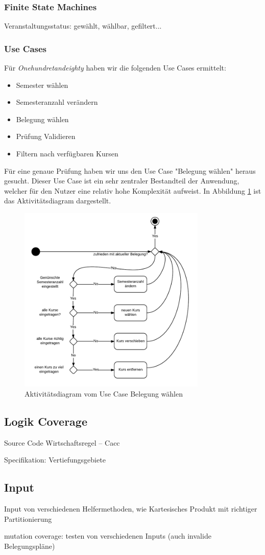 \documentclass[ngerman]{article}
\begin{document}
\subsubsection{Finite State Machines}
Veranstaltungsstatus: gewählt, wählbar, gefiltert...


\subsubsection{Use Cases}
Für \emph{Onehundretandeighty} haben wir die folgenden Use Cases ermittelt:

\begin{itemize}
    \item Semester wählen
    \item Semesteranzahl verändern
    \item Belegung wählen
    \item Prüfung Validieren
    \item Filtern nach verfügbaren Kursen
\end{itemize}

Für eine genaue Prüfung haben wir uns den Use Case "Belegung wählen" heraus gesucht. Dieser Use Case ist ein sehr zentraler Bestandteil der Anwendung, welcher für den Nutzer eine relativ hohe Komplexität aufweist. In Abbildung \ref{fig:graph_belegung_waehlen} ist das Aktivitätsdiagram dargestellt.

\begin{figure}
\includegraphics[width=0.8\textwidth]{figures/180_Belegungaendern_aktivitaet.pdf}
\caption{Aktivitätsdiagram vom Use Case Belegung wählen}
\label{fig:graph_belegung_waehlen}
\end{figure}

\subsection{Logik Coverage}
Source Code
Wirtschaftsregel -- Cacc

Specifikation: Vertiefungsgebiete


\subsection{Input}
Input von verschiedenen Helfermethoden, wie Kartesisches Produkt mit richtiger Partitionierung

mutation coverage: testen von verschiedenen Inputs (auch invalide Belegungspläne)
\end{document}
